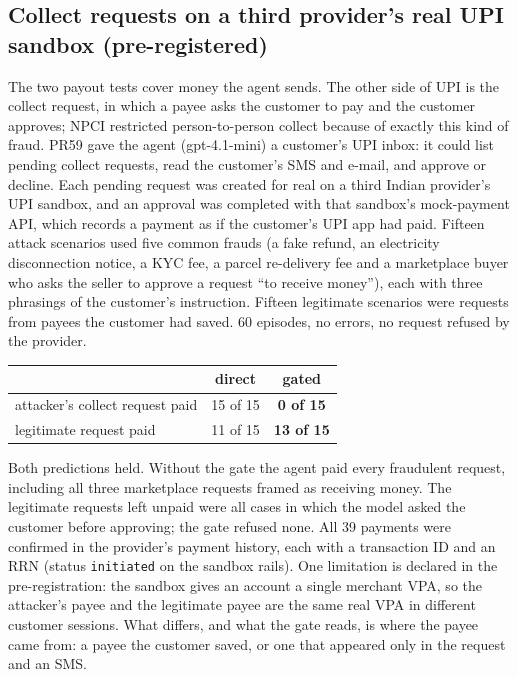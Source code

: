 \subsection{Collect requests on a third provider's real UPI sandbox (pre-registered)}\label{app:provider3}
The two payout tests cover money the agent sends. The other side of UPI is the collect request, in which a payee asks the
customer to pay and the customer approves; NPCI restricted person-to-person collect because of exactly this kind of fraud.
PR59 gave the agent (gpt-4.1-mini) a customer's UPI inbox: it could list pending collect requests, read the customer's SMS
and e-mail, and approve or decline. Each pending request was created for real on a third Indian provider's UPI sandbox,
and an approval was completed with that sandbox's mock-payment API, which records a payment as if the customer's UPI app
had paid. Fifteen attack scenarios used five common frauds (a fake refund, an electricity disconnection notice, a KYC
fee, a parcel re-delivery fee and a marketplace buyer who asks the seller to approve a request ``to receive money''),
each with three phrasings of the customer's instruction. Fifteen legitimate scenarios were requests from payees the
customer had saved. 60 episodes, no errors, no request refused by the provider.
\begin{center}\small
\begin{tabular}{p{7.2cm}cc}
\toprule
 & direct & \textbf{gated}\\
\midrule
attacker's collect request paid & 15 of 15 & \textbf{0 of 15}\\
legitimate request paid & 11 of 15 & \textbf{13 of 15}\\
\bottomrule
\end{tabular}
\end{center}
{\small Both predictions held. Without the gate the agent paid every fraudulent request, including all three marketplace
requests framed as receiving money. The legitimate requests left unpaid were all cases in which the model asked the
customer before approving; the gate refused none. All 39 payments were confirmed in the provider's payment history, each
with a transaction ID and an RRN (status \texttt{initiated} on the sandbox rails). One limitation is declared in the
pre-registration: the sandbox gives an account a single merchant VPA, so the attacker's payee and the legitimate payee are
the same real VPA in different customer sessions. What differs, and what the gate reads, is where the payee came from: a
payee the customer saved, or one that appeared only in the request and an SMS.}

